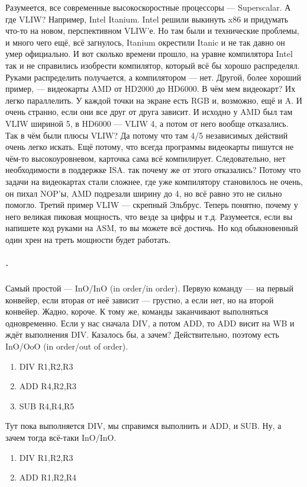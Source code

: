 \documentclass{article}
\begin{document}
    Разумеется, все современные высокоскоростные процессоры --- Superscalar. А где VLIW? Например, Intel Itanium. Intel решили выкинуть x86 и придумать что-то на новом, перспективном VLIW'е. Но там были и технические проблемы, и много чего ещё, всё загнулось, Itanium окрестили Itanic и не так давно он умер официально. И вот сколько времени прошло, на уравне компилятора Intel так и не справились изобрести компилятор, который всё бы хорошо распределял. Руками распределить получается, а компилятором --- нет. Другой, более хороший пример, --- видеокарты AMD от HD2000 до HD6000. В чём мем видеокарт? Их легко параллелить. У каждой точки на экране есть RGB и, возможно, ещё и A. И очень странно, если они все друг от друга зависит. И исходно у AMD был там VLIW шириной 5, в HD6000 --- VLIW 4, а потом от него вообще отказались. Так в чём были плюсы VLIW? Да потому что там 4/5 независимых действий очень легко искать. Ещё потому, что всегда программы видеокарты пишутся не чём-то высокоуровневом, карточка сама всё компилирует. Следовательно, нет необходимости в поддержке ISA. так почему же от этого отказались? Потому что задачи на видеокартах стали сложнее, где уже компилятору становилось не очень, он пихал NOP'ы, AMD подрезали ширину до 4, но всё равно это не сильно помогло. Третий пример VLIW --- скрепный Эльбрус. Теперь понятно, почему у него великая пиковая мощность, что везде за цифры и т.д. Разумеется, если вы напишете код руками на ASM, то вы можете всё достичь. Но код обыкновенный один хрен на треть мощности будет работать.
    \subparagraph{.}
    Самый простой --- InO/InO (in order/in order). Первую команду --- на первый конвейер, если вторая от неё зависит --- грустно, а если нет, но на второй конвейер. Жадно, короче. К тому же, команды заканчивают выполняться одновременно. Если у нас сначала DIV, а потом ADD, то ADD висит на WB и ждёт выполнения DIV.
    Казалось бы, а зачем? Действительно, поэтому есть InO/OoO (in order/out of order).
    \begin{enumerate}[1.]
        \item DIV R1,R2,R3
        \item ADD R4,R2,R3
        \item SUB R4,R4,R5
    \end{enumerate}
    Тут пока выполняется DIV, мы справимся выполнить и ADD, и SUB. Ну, а зачем тогда всё-таки InO/InO.
    \begin{enumerate}[1.]
        \item DIV R1,R2,R3
        \item ADD R1,R2,R4
    \end{enumerate}
\end{document}
